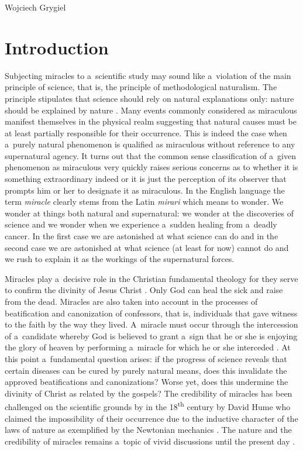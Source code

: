 \begin{artengenv}{Wojciech Grygiel}
\section*{Introduction}
Subjecting miracles to a~scientific study may sound like a~violation of the main principle of science, that is, the principle of methodological naturalism. The principle stipulates that science should rely on natural explanations only: nature should be explained by nature
\parencite[e.g.][]{plantinga_methodological_2001}. %
 Many events commonly considered as miraculous manifest themselves in the physical realm suggesting that natural causes must be at least partially responsible for their occurrence. This is indeed the case when a~purely natural phenomenon is qualified as miraculous without reference to any supernatural agency. It turns out that the common sense classification of a~given phenomenon as miraculous very quickly raises serious concerns as to whether it is something extraordinary indeed or it is just the perception of its observer that prompts him or her to designate it as miraculous. In the English language the term \textit{miracle} clearly stems from the Latin \textit{mirari} which means to wonder. We wonder at things both natural and supernatural: we wonder at the discoveries of science and we wonder when we experience a~sudden healing from a~deadly cancer. In the first case we are astonished at what science can do and in the second case we are astonished at what science (at least for now) cannot do and we rush to explain it as the workings of the supernatural forces.

Miracles play a~decisive role in the Christian fundamental theology for they serve to confirm the divinity of Jesus Christ
\parencite[][pp.330–359]{rusecki_traktat_2006}. %
 Only God can heal the sick and raise from the dead. Miracles are also taken into account in the processes of beatification and canonization of confessors, that is, individuals that gave witness to the faith by the way they lived. A~miracle must occur through the intercession of a~candidate whereby God is believed to grant a~sign that he or she is enjoying the glory of heaven by performing a~miracle for which he or she interceded 
\parencite[][]{john_paul_ii_apostolic_1983}. %
 At this point a~fundamental question arises: if the progress of science reveals that certain diseases can be cured by purely natural means, does this invalidate the approved beatifications and canonizations? Worse yet, does this undermine the divinity of Christ as related by the gospels? The credibility of miracles has been challenged on the scientific grounds by in the 18\textsuperscript{th} century by David Hume who claimed the impossibility of their occurrence due to the inductive character of the laws of nature as exemplified by the Newtonian mechanics 
\parencite[][pp.79–95]{hume_enquiry_2008}.%
 The nature and the credibility of miracles remains a~topic of vivid discussions until the present day 
\parencite[e.g.][]{mcgrew_miracles_2019}.%



\end{artengenv}
